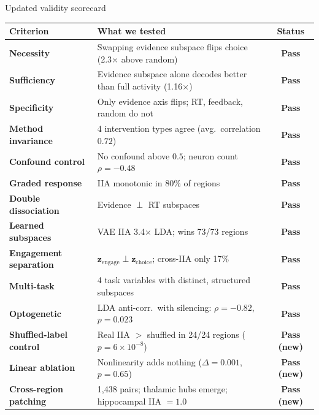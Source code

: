 \documentclass[aspectratio=169,11pt]{beamer}
\begin{document}
\begin{frame}{Updated validity scorecard}
\vspace{-0.5em}
{\scriptsize
\begin{tabular}{lp{7cm}c}
\toprule
\textbf{Criterion} & \textbf{What we tested} & \textbf{Status} \\
\midrule
\textbf{Necessity} & Swapping evidence subspace flips choice (2.3$\times$ above random) & \textcolor{pass}{\textbf{Pass}} \\
\textbf{Sufficiency} & Evidence subspace alone decodes better than full activity (1.16$\times$) & \textcolor{pass}{\textbf{Pass}} \\
\textbf{Specificity} & Only evidence axis flips; RT, feedback, random do not & \textcolor{pass}{\textbf{Pass}} \\
\textbf{Method invariance} & 4 intervention types agree (avg.\ correlation $0.72$) & \textcolor{pass}{\textbf{Pass}} \\
\textbf{Confound control} & No confound above $0.5$; neuron count $\rho = -0.48$ & \textcolor{pass}{\textbf{Pass}} \\
\textbf{Graded response} & IIA monotonic in 80\% of regions & \textcolor{pass}{\textbf{Pass}} \\
\textbf{Double dissociation} & Evidence $\perp$ RT subspaces & \textcolor{pass}{\textbf{Pass}} \\
\textbf{Learned subspaces} & VAE IIA 3.4$\times$ LDA; wins 73/73 regions & \textcolor{pass}{\textbf{Pass}} \\
\textbf{Engagement separation} & $\mathbf{z}_{\text{engage}} \perp \mathbf{z}_{\text{choice}}$; cross-IIA only 17\% & \textcolor{pass}{\textbf{Pass}} \\
\textbf{Multi-task} & 4 task variables with distinct, structured subspaces & \textcolor{pass}{\textbf{Pass}} \\
\textbf{Optogenetic} & LDA anti-corr.\ with silencing: $\rho = -0.82$, $p = 0.023$ & \textcolor{pass}{\textbf{Pass}} \\
\textbf{Shuffled-label control} & Real IIA $>$ shuffled in 24/24 regions ($p = 6 \times 10^{-8}$) & \textcolor{pass}{\textbf{Pass (new)}} \\
\textbf{Linear ablation} & Nonlinearity adds nothing ($\Delta = 0.001$, $p = 0.65$) & \textcolor{pass}{\textbf{Pass (new)}} \\
\textbf{Cross-region patching} & 1,438 pairs; thalamic hubs emerge; hippocampal IIA $= 1.0$ & \textcolor{pass}{\textbf{Pass (new)}} \\

\end{tabular}}
\end{frame}
\end{document}
